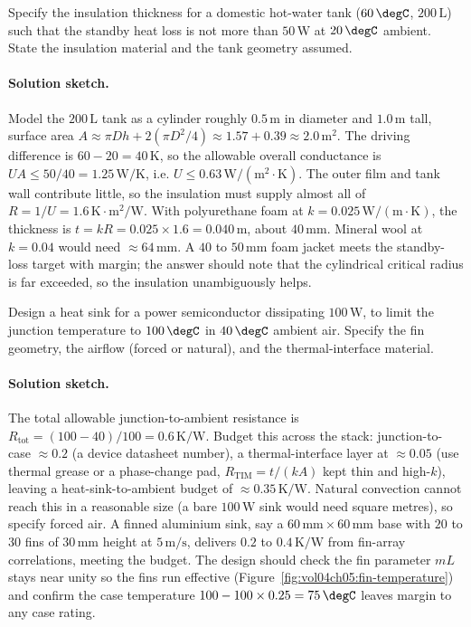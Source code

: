 \begin{exercise}
Specify the insulation thickness for a domestic hot-water tank
($60\,\degC$, $200\,\text{L}$) such that the standby heat loss is
not more than $50\,\text{W}$ at $20\,\degC$ ambient. State the
insulation material and the tank geometry assumed.
\paragraph{Solution sketch.} Model the $200\,\text{L}$ tank as a
cylinder roughly $0.5\,\text{m}$ in diameter and $1.0\,\text{m}$ tall,
surface area $A \approx \pi D h + 2(\pi D^2/4) \approx 1.57 + 0.39
\approx 2.0\,\text{m}^2$. The driving difference is $60 - 20 = 40\,
\si{\kelvin}$, so the allowable overall conductance is $UA \leq 50/40 =
1.25\,\text{W}/\si{\kelvin}$, i.e. $U \leq 0.63\,\text{W}/(\text{m}^2
\cdot\si{\kelvin})$. The outer film and tank wall contribute little, so
the insulation must supply almost all of $R = 1/U = 1.6\,\si{\kelvin}
\cdot\text{m}^2/\text{W}$. With polyurethane foam at $k = 0.025\,
\text{W}/(\text{m}\cdot\si{\kelvin})$, the thickness is $t = kR = 0.025
\times 1.6 = 0.040\,\text{m}$, about $40\,\si{\milli\meter}$. Mineral
wool at $k = 0.04$ would need $\approx 64\,\si{\milli\meter}$. A
$40$ to $50\,\si{\milli\meter}$ foam jacket meets the standby-loss
target with margin; the answer should note that the cylindrical critical
radius is far exceeded, so the insulation unambiguously helps.
\end{exercise}

\begin{exercise}
Design a heat sink for a power semiconductor dissipating $100\,\text{W}$,
to limit the junction temperature to $100\,\degC$ in $40\,\degC$
ambient air. Specify the fin geometry, the airflow (forced or
natural), and the thermal-interface material.
\paragraph{Solution sketch.} The total allowable junction-to-ambient
resistance is $R_{\text{tot}} = (100 - 40)/100 = 0.6\,\si{\kelvin}/
\text{W}$. Budget this across the stack: junction-to-case $\approx 0.2$
(a device datasheet number), a thermal-interface layer at $\approx 0.05$
(use thermal grease or a phase-change pad, $R_{\text{TIM}} = t/(k A)$ kept
thin and high-$k$), leaving a heat-sink-to-ambient budget of $\approx
0.35\,\si{\kelvin}/\text{W}$. Natural convection cannot reach this in a
reasonable size (a bare $100\,\text{W}$ sink would need square metres),
so specify forced air. A finned aluminium sink, say a $60\,\si{
\milli\meter}\times 60\,\si{\milli\meter}$ base with $20$ to $30$ fins of
$30\,\si{\milli\meter}$ height at $5\,\text{m/s}$, delivers $0.2$ to
$0.4\,\si{\kelvin}/\text{W}$ from fin-array correlations, meeting the
budget. The design should check the fin parameter $mL$ stays near unity
so the fins run effective (Figure~\ref{fig:vol04ch05:fin-temperature})
and confirm the case temperature $100 - 100\times0.25 = 75\,\degC$
leaves margin to any case rating.
\end{exercise}


